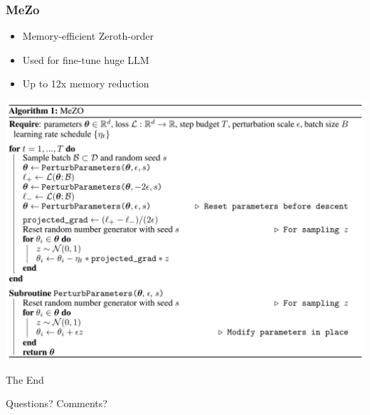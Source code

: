 \documentclass[
	11pt, %
]{beamer}
\begin{document}
\begin{frame}
  \frametitle{MeZo}
  \begin{itemize}
  \item Memory-efficient Zeroth-order
  \item Used for fine-tune huge LLM
  \item Up to 12x memory reduction
  \end{itemize}
  
   \centerline{\includegraphics[width=0.6\columnwidth]{../report/images/mezo_alg.png}}
\end{frame}


\begin{frame}%
	\begin{center}
		{\Huge The End}
		
		\bigskip\bigskip %
		
		{\LARGE Questions? Comments?}
	\end{center}
\end{frame}

\end{document}
